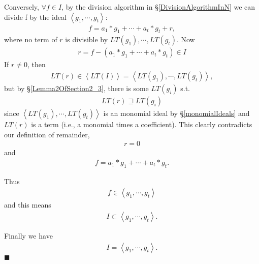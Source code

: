 \documentclass[11pt]{book}
\begin{document}
Conversely, $\forall f \in I$, by the division algorithm in \S\ref{DivisionAlgorithmInN} we can divide f by the ideal $\left< g_1, \cdots, g_t \right>$:
\begin{eqnarray}
f = a_1 * g_1 + \cdots + a_t * g_t + r,
\end{eqnarray}
where no term of $r$ is divisible by $LT(g_1), \cdots, LT(g_t)$.
Now
\begin{eqnarray}
r = f - \left( a_1 * g_1 + \cdots + a_t * g_t \right) \in I
\end{eqnarray}
If $r \neq 0$, then 
\begin{eqnarray}
LT(r) \in \left< LT(I) \right> = \left< LT(g_1), \cdots, LT(g_t) \right>,
\end{eqnarray}
but by \S\ref{Lemma2OfSection2_3}, there is some $LT(g_i)$ s.t.
\begin{eqnarray}
LT(r) \sqsupseteq LT(g_i)
\end{eqnarray}
since $\left< LT(g_1), \cdots, LT(g_t) \right>$ is an monomial ideal by \S\ref{monomialIdeals} and $LT(r)$ is a term (i.e., a monomial times a coefficient).
This clearly contradicts our definition of remainder,
\begin{eqnarray}
r = 0
\end{eqnarray}
and
\begin{eqnarray}
f = a_1 * g_1 + \cdots + a_t * g_t.
\end{eqnarray}

Thus
\begin{eqnarray}
f \in \left< g_1, \cdots, g_t \right>
\end{eqnarray}
and this means 
\begin{eqnarray}
\label{HilbertSupset}
I \subset \left< g_1, \cdots, g_t \right>.
\end{eqnarray}

Finally we have
\begin{eqnarray}
\label{HilbertGenerators}
I = \left< g_1, \cdots, g_t \right>.
\end{eqnarray}
$\blacksquare$
\end{document}
